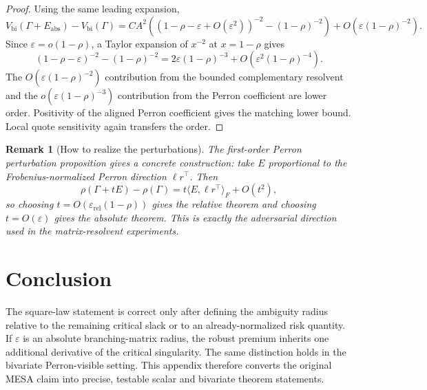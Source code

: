 \documentclass[11pt]{article}
\newtheorem{remark}{Remark}
\newcommand{\eps}{\varepsilon}
\begin{document}
\begin{proof}
Using the same leading expansion,
\[
V_{\mathrm{bi}}(\Gamma+\!E_{\mathrm{abs}})-V_{\mathrm{bi}}(\Gamma)
=
C A^2\left((1-\rho-\eps+O(\eps^2))^{-2}
-(1-\rho)^{-2}\right)
+O(\eps(1-\rho)^{-2}).
\]
Since $\eps=o(1-\rho)$, a Taylor expansion of $x^{-2}$ at $x=1-\rho$ gives
\[
(1-\rho-\eps)^{-2}-(1-\rho)^{-2}
=
2\eps(1-\rho)^{-3}+O(\eps^2(1-\rho)^{-4}).
\]
The $O(\eps(1-\rho)^{-2})$ contribution from the bounded complementary resolvent
and the $o(\eps(1-\rho)^{-3})$ contribution from the Perron coefficient are
lower order. Positivity of the aligned Perron coefficient gives the matching
lower bound. Local quote sensitivity again transfers the order.
\end{proof}

\begin{remark}[How to realize the perturbations]
The first-order Perron perturbation proposition gives a concrete construction:
take $E$ proportional to the Frobenius-normalized Perron direction
$\ell r^\top$. Then
\[
\rho(\Gamma+tE)-\rho(\Gamma)=t\langle E,\ell r^\top\rangle_F+O(t^2),
\]
so choosing $t=O(\eps_{\mathrm{rel}}(1-\rho))$ gives the relative theorem and
choosing $t=O(\eps)$ gives the absolute theorem. This is exactly the adversarial
direction used in the matrix-resolvent experiments.
\end{remark}

\section{Conclusion}

The square-law statement is correct only after defining the ambiguity radius
relative to the remaining critical slack or to an already-normalized risk
quantity. If $\eps$ is an absolute branching-matrix radius, the robust premium
inherits one additional derivative of the critical singularity. The same
distinction holds in the bivariate Perron-visible setting. This appendix
therefore converts the original MESA claim into precise, testable scalar and
bivariate theorem statements.
\end{document}
